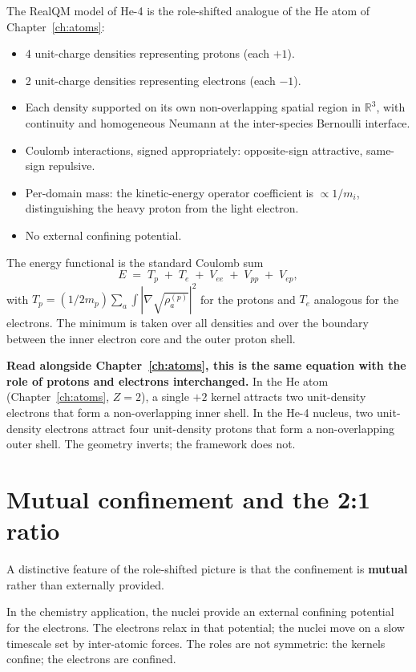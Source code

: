 The RealQM model of He-4 is the role-shifted analogue of the He atom of Chapter~\ref{ch:atoms}:

\begin{itemize}
\item 4 unit-charge densities representing protons (each $+1$).
\item 2 unit-charge densities representing electrons (each $-1$).
\item Each density supported on its own non-overlapping spatial region in $\mathbb{R}^3$, with continuity and homogeneous Neumann at the inter-species Bernoulli interface.
\item Coulomb interactions, signed appropriately: opposite-sign attractive, same-sign repulsive.
\item Per-domain mass: the kinetic-energy operator coefficient is $\propto 1/m_i$, distinguishing the heavy proton from the light electron.
\item No external confining potential.
\end{itemize}

The energy functional is the standard Coulomb sum
\begin{equation}\label{eq:nuc-energy}
E \;=\; T_p \;+\; T_e \;+\; V_{ee} \;+\; V_{pp} \;+\; V_{ep},
\end{equation}
with $T_p = (1/2 m_p) \sum_a \int |\nabla \sqrt{\rho_a^{(p)}}|^2$ for the protons and $T_e$ analogous for the electrons. The minimum is taken over all densities and over the boundary between the inner electron core and the outer proton shell.

\textbf{Read alongside Chapter~\ref{ch:atoms}, this is the same equation with the role of protons and electrons interchanged.} In the He atom (Chapter~\ref{ch:atoms}, $Z=2$), a single $+2$ kernel attracts two unit-density electrons that form a non-overlapping inner shell. In the He-4 nucleus, two unit-density electrons attract four unit-density protons that form a non-overlapping outer shell. The geometry inverts; the framework does not.

\section{Mutual confinement and the 2:1 ratio}\label{sec:mutual}

A distinctive feature of the role-shifted picture is that the confinement is \textbf{mutual} rather than externally provided.

In the chemistry application, the nuclei provide an external confining potential for the electrons. The electrons relax in that potential; the nuclei move on a slow timescale set by inter-atomic forces. The roles are not symmetric: the kernels confine; the electrons are confined.

